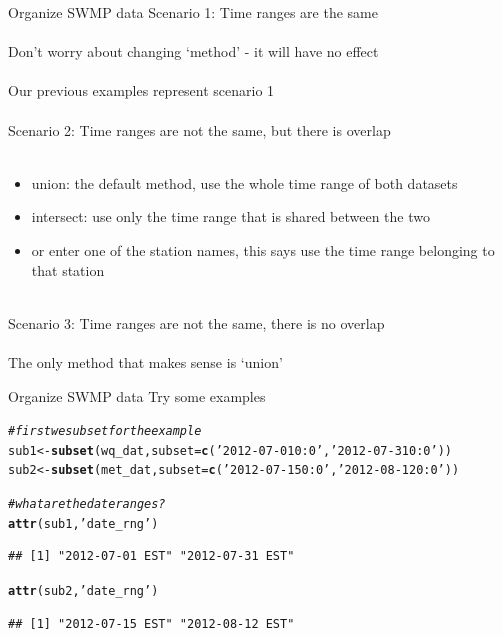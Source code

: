 \documentclass[xcolor=svgnames]{beamer}\usepackage[]{graphicx}\usepackage[]{color}
\makeatletter
\newcommand{\hlstr}[1]{\textcolor[rgb]{0.192,0.494,0.8}{#1}}%
\newcommand{\hlcom}[1]{\textcolor[rgb]{0.678,0.584,0.686}{\textit{#1}}}%
\newcommand{\hlstd}[1]{\textcolor[rgb]{0.345,0.345,0.345}{#1}}%
\newcommand{\hlkwb}[1]{\textcolor[rgb]{0.69,0.353,0.396}{#1}}%
\newcommand{\hlkwc}[1]{\textcolor[rgb]{0.333,0.667,0.333}{#1}}%
\newcommand{\hlkwd}[1]{\textcolor[rgb]{0.737,0.353,0.396}{\textbf{#1}}}%
\newenvironment{kframe}{%
 \def\at@end@of@kframe{}%
 \ifinner\ifhmode%
  \def\at@end@of@kframe{\end{minipage}}%
  \begin{minipage}{\columnwidth}%
 \fi\fi%
 \def\FrameCommand##1{\hskip\@totalleftmargin \hskip-\fboxsep
 \colorbox{shadecolor}{##1}\hskip-\fboxsep
     \hskip-\linewidth \hskip-\@totalleftmargin \hskip\columnwidth}%
 \MakeFramed {\advance\hsize-\width
   \@totalleftmargin\z@ \linewidth\hsize
   \@setminipage}}%
 {\par\unskip\endMakeFramed%
 \at@end@of@kframe}
\newenvironment{knitrout}{}{} %
\makeatother
\begin{document}
\begin{frame}{Organize SWMP data}
\onslide<+->
\alert{Scenario 1}: Time ranges are the same \\~\\
Don't worry about changing `method' - it will have no effect\\~\\
Our previous examples represent scenario 1 \\~\\
\onslide<+->
\alert{Scenario 2}: Time ranges are not the same, but there is overlap \\~\\
\begin{itemize}
\item union: the default method, use the whole time range of both datasets
\item intersect: use only the time range that is shared between the two
\item or enter one of the station names, this says use the time range belonging to that station\\~\\
\end{itemize}
\onslide<+->
\alert{Scenario 3}: Time ranges are not the same, there is no overlap \\~\\
The only method that makes sense is `union'
\end{frame}

\begin{frame}[containsverbatim]{Organize SWMP data}
Try some examples
\begin{knitrout}\scriptsize
{}\color{fgcolor}\begin{kframe}
\begin{alltt}
\hlcom{# first we subset for the example}
\hlstd{sub1} \hlkwb{<-} \hlkwd{subset}\hlstd{(wq_dat,} \hlkwc{subset} \hlstd{=} \hlkwd{c}\hlstd{(}\hlstr{'2012-07-01 0:0'}\hlstd{,} \hlstr{'2012-07-31 0:0'}\hlstd{))}
\hlstd{sub2} \hlkwb{<-} \hlkwd{subset}\hlstd{(met_dat,} \hlkwc{subset} \hlstd{=} \hlkwd{c}\hlstd{(}\hlstr{'2012-07-15 0:0'}\hlstd{,} \hlstr{'2012-08-12 0:0'}\hlstd{))}

\hlcom{# what are the date ranges?}
\hlkwd{attr}\hlstd{(sub1,} \hlstr{'date_rng'}\hlstd{)}
\end{alltt}
\begin{verbatim}
## [1] "2012-07-01 EST" "2012-07-31 EST"
\end{verbatim}
\begin{alltt}
\hlkwd{attr}\hlstd{(sub2,} \hlstr{'date_rng'}\hlstd{)}
\end{alltt}
\begin{verbatim}
## [1] "2012-07-15 EST" "2012-08-12 EST"
\end{verbatim}
\end{kframe}
\end{knitrout}
\end{frame}
\end{document}
